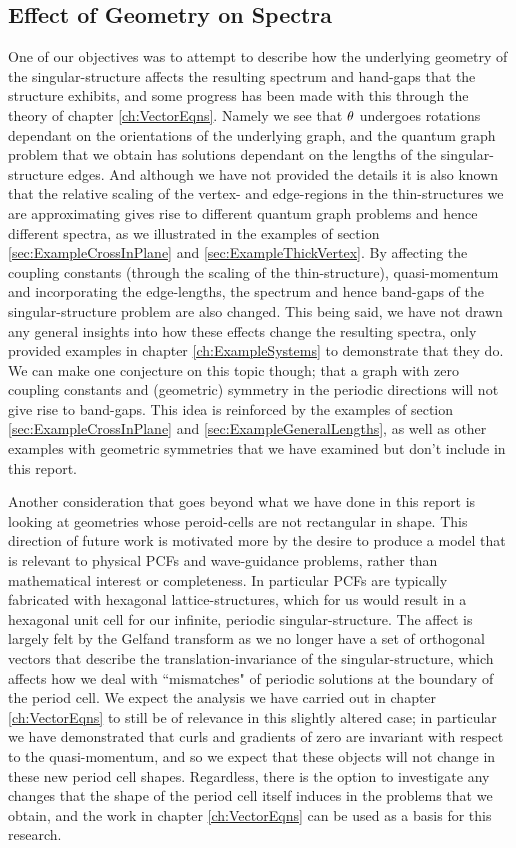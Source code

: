 \subsection{Effect of Geometry on Spectra} \label{sec:ConcFutureGeometry}
One of our objectives was to attempt to describe how the underlying geometry of the singular-structure affects the resulting spectrum and hand-gaps that the structure exhibits, and some progress has been made with this through the theory of chapter \ref{ch:VectorEqns}.
Namely we see that $\theta$ undergoes rotations dependant on the orientations of the underlying graph, and the quantum graph problem that we obtain has solutions dependant on the lengths of the singular-structure edges.
And although we have not provided the details it is also known that the relative scaling of the vertex- and edge-regions in the thin-structures we are approximating gives rise to different quantum graph problems and hence different spectra, as we illustrated in the examples of section \ref{sec:ExampleCrossInPlane} and \ref{sec:ExampleThickVertex}.
By affecting the coupling constants (through the scaling of the thin-structure), quasi-momentum and incorporating the edge-lengths, the spectrum and hence band-gaps of the singular-structure problem are also changed.
This being said, we have not drawn any general insights into how these effects change the resulting spectra, only provided examples in chapter \ref{ch:ExampleSystems} to demonstrate that they do.
We can make one conjecture on this topic though; that a graph with zero coupling constants and (geometric) symmetry in the periodic directions will not give rise to band-gaps.
This idea is reinforced by the examples of section \ref{sec:ExampleCrossInPlane} and \ref{sec:ExampleGeneralLengths}, as well as other examples with geometric symmetries that we have examined but don't include in this report. \newline

Another consideration that goes beyond what we have done in this report is looking at geometries whose peroid-cells are not rectangular in shape.
This direction of future work is motivated more by the desire to produce a model that is relevant to physical PCFs and wave-guidance problems, rather than mathematical interest or completeness.
In particular PCFs are typically fabricated with hexagonal lattice-structures, which for us would result in a hexagonal unit cell for our infinite, periodic singular-structure.
The affect is largely felt by the Gelfand transform as we no longer have a set of orthogonal vectors that describe the translation-invariance of the singular-structure, which affects how we deal with ``mismatches" of periodic solutions at the boundary of the period cell.
We expect the analysis we have carried out in chapter \ref{ch:VectorEqns} to still be of relevance in this slightly altered case; in particular we have demonstrated that curls and gradients of zero are invariant with respect to the quasi-momentum, and so we expect that these objects will not change in these new period cell shapes.
Regardless, there is the option to investigate any changes that the shape of the period cell itself induces in the problems that we obtain, and the work in chapter \ref{ch:VectorEqns} can be used as a basis for this research.

